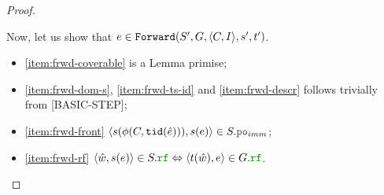 \documentclass[12pt]{article}
\begin{document}
\begin{proof}
\begin{itemize}
  \end{itemize}

  Now, let us show that $e \in {\mathtt{Forward}}(S', G, \langle C, I \rangle, s', t')$.

  \begin{itemize}

    \item \ref{item:frwd-coverable} is a Lemma primise;

    \item \ref{item:frwd-dom-s}, \ref{item:frwd-ts-id} and \ref{item:frwd-descr}
      follows trivially from [BASIC-STEP];

    \item \ref{item:frwd-front}
      $\tup{s(\front(C, \lTID(\hat{e}))), s(e)} \in S.\lPO_{imm}$;

    \item \ref{item:frwd-rf}
      $\tup{\hat{w}, s(e)} \in S.\lRF \Leftrightarrow \tup{t(\hat{w}), e} \in G.\lRF$.
    
  \end{itemize}
\end{proof}


  
\end{document}
